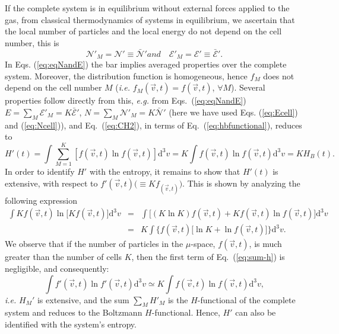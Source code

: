 If the complete system is in equilibrium without external forces applied to
the gas, from classical thermodynamics of
systems in equilibrium, we ascertain that the local number
of particles and the local
energy do not depend on the cell number, this is
%
\begin{subequations}\label{eq:eqNandE}
\begin{equation}
   \mathcal{N}'_M=\mathcal{N}'\equiv \bar{\mathcal{N}}'
\end{equation}
%
and
%
\begin{equation}
   \quad\mathcal{E}'_M=\mathcal{E}'\equiv\bar{\mathcal{E}}'.
\end{equation}
\end{subequations}
%
In Eqs. (\ref{eq:eqNandE}) the bar implies averaged properties over the complete system.
Moreover, the distribution function is homogeneous, hence $f_M$
does not depend on the cell number $M$ (\textit{i.e.} $f_M(\vec v,t)=f(\vec v,t)$,
$\forall M$). Several properties follow directly from this, \textit{e.g.}
from Eqs.~(\ref{eq:eqNandE}) $E=\sum_M\mathcal{E}'_M=K\bar{\mathcal{E}}'$, $N=\sum_M\mathcal{N}'_M=K\bar{\mathcal{N}}'$ (here we have used Eqs. (\ref{eq:Ecell})
and (\ref{eq:Ncell})),
and Eq.~(\ref{eq:CH2}), in terms of Eq.~(\ref{eq:hbfunctional}), reduces to
%
\begin{equation}
    H'(t)=\int \sum_{M=1}^{K} [f(\vec{v},t)\ln f(\vec{v},t)] \mathrm{d}^{3}v
         = K\int  f(\vec{v},t) \ln f(\vec{v},t) \mathrm{d}^{3}v= K H_{B}(t).
\end{equation}
%
In order to identify $H'$ with the entropy, it remains to show that $H'(t)$ is extensive,
with respect to $f'(\vec v,t)\big(\equiv Kf_(\vec v,t)\big)$.
This is shown by analyzing the following expression
%
\begin{eqnarray}\label{eq:sum-h}
    \int Kf(\vec{v},t) \ln \big[Kf(\vec{v},t)\big] \mathrm{d}^{3}v & = & 
        \int \big[(K\ln K)f(\vec{v},t) + Kf(\vec{v},t) \ln f(\vec{v},t)\big]\mathrm{d}^{3}v\nonumber\\
        & = & K\int\Big\{ f(\vec{v},t)\big[\ln K + \ln f(\vec{v},t)\big] \Big\}\mathrm{d}^{3}v.
\end{eqnarray}
%
We observe that if the number of particles in the $\mu$-space, $f(\vec{v},t)$, is much greater than
the number of cells $K$, then the first term of Eq.~(\ref{eq:sum-h}) is negligible, and consequently:
%
\begin{equation}\label{aditive-property}
    \int f'(\vec{v},t) \ln f'(\vec{v},t) \mathrm{d}^{3}v \simeq
    K\int f(\vec{v},t) \ln f(\vec{v},t) \mathrm{d}^{3}v,
\end{equation}
%
\textit{i.e.} $H_M'$ is extensive, and the sum $\sum_MH'_M$ is the $H$-functional of the complete
system and reduces to the Boltzmann $H$-functional. Hence, $H'$ can also be identified with the
system's entropy.

